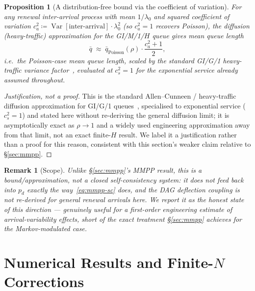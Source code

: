 \documentclass[11pt,a4paper]{report}
\newtheorem{proposition}[theorem]{Proposition}
\newtheorem{remark}{Remark}[section]
\begin{document}
\begin{proposition}[A distribution-free bound via the coefficient of
variation]
\label{prop:renewal-bound}
For any renewal inter-arrival process with mean $1/\lambda_0$ and
squared coefficient of variation $c_a^2 \coloneqq
\operatorname{Var}[\text{inter-arrival}]\cdot\lambda_0^2$ (so
$c_a^2=1$ recovers Poisson), the diffusion (heavy-traffic)
approximation for the GI/M/1/$H$ queue gives mean queue length
\begin{equation}
  \bar q \;\approx\; \bar q_{\mathrm{Poisson}}(\rho)
  \cdot \frac{c_a^2 + 1}{2},
  \label{eq:renewal-approx}
\end{equation}
i.e.\ the Poisson-case mean queue length, scaled by the standard
GI/G/1 heavy-traffic variance factor~\cite{kleinrock1975}, evaluated
at $c_s^2=1$ for the exponential service already assumed throughout.
\end{proposition}

\begin{proof}[Justification, not a proof]
This is the standard Allen--Cunneen / heavy-traffic diffusion
approximation for GI/G/1 queues~\cite{allen1990,kleinrock1975,kelly1979},
specialised to exponential service ($c_s^2=1$) and stated here without
re-deriving the general diffusion limit; it is asymptotically exact as
$\rho\to1$ and a widely used engineering approximation away from that
limit, not an exact finite-$H$ result. We label it a justification
rather than a proof for this reason, consistent with this section's
weaker claim relative to \S\ref{sec:mmpp}.
\end{proof}

\begin{remark}[Scope]
Unlike \S\ref{sec:mmpp}'s MMPP result, this is a bound/approximation,
not a closed self-consistency system: it does not feed back into $p_d$
exactly the way~\eqref{eq:mmpp-sc} does, and the DAG deflection
coupling is not re-derived for general renewal arrivals here. We
report it as the honest state of this direction --- genuinely useful
for a first-order engineering estimate of arrival-variability effects,
short of the exact treatment \S\ref{sec:mmpp} achieves for the
Markov-modulated case.
\end{remark}

\section{Numerical Results and Finite-$N$ Corrections}
\label{sec:sim}
\end{document}
